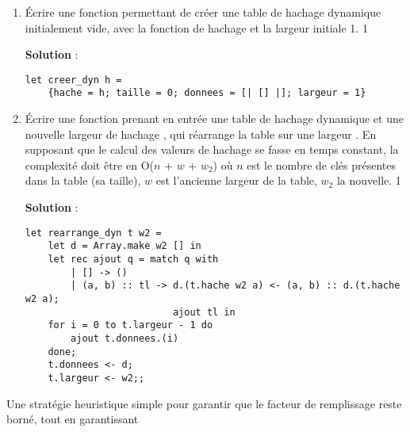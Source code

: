 \documentclass[10pt,a4paper, varwidth]{article}
\def\cor{1}
\begin{document}
	\begin{enumerate}
		\item Écrire une fonction  permettant de créer une table de hachage dynamique initialement vide, 
        avec la fonction de hachage  et la largeur initiale 1.
		\if\cor1
        \begin{emphase}
            \textbf{Solution} : 
            \begin{center}
                \begin{minipage}{.7\textwidth}
                \begin{verbatim}
let creer_dyn h =
    {hache = h; taille = 0; donnees = [| [] |]; largeur = 1}
\end{verbatim}
                \end{minipage}
            \end{center}
        \end{emphase}
        \fi 
		\item Écrire une fonction  prenant en entrée une table de hachage dynamique  et une
		nouvelle largeur de hachage , qui réarrange la table sur une largeur . En supposant que le calcul des valeurs
		de hachage se fasse en temps constant, la complexité doit être en O($n$ + $w$ + $w_2$) où $n$ est le nombre de clés
		présentes dans la table (sa taille), $w$ est l'ancienne largeur de la table, $w_2$ la nouvelle.
        \if\cor1
        \begin{emphase}
            \textbf{Solution} : 
            \begin{center}
                \begin{minipage}{\textwidth}
                \begin{verbatim}
let rearrange_dyn t w2 =
    let d = Array.make w2 [] in
    let rec ajout q = match q with
        | [] -> ()
        | (a, b) :: tl -> d.(t.hache w2 a) <- (a, b) :: d.(t.hache w2 a);
                          ajout tl in
    for i = 0 to t.largeur - 1 do
        ajout t.donnees.(i)
    done;
    t.donnees <- d;
    t.largeur <- w2;;    
                \end{verbatim}
                \end{minipage}
            \end{center}
        \end{emphase}
        \fi
	\end{enumerate}
	Une stratégie heuristique simple pour garantir que le facteur de remplissage reste borné, tout en garantissant
\end{document}

